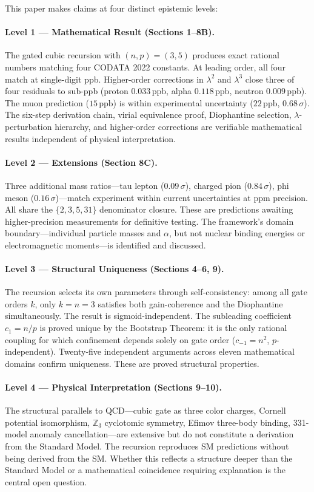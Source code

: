 \documentclass[12pt,a4paper]{article}
\theoremstyle{definition}
\newcommand{\ppb}{\,\mathrm{ppb}}
\begin{document}
This paper makes claims at four distinct epistemic levels:

\paragraph{Level 1 --- Mathematical Result (Sections 1--8B).}
The gated cubic recursion with $(n,p) = (3,5)$ produces exact rational
numbers matching four CODATA 2022 constants. At leading order, all four
match at single-digit ppb. Higher-order corrections in $\lambda^2$ and
$\lambda^3$ close three of four residuals to sub-ppb (proton $0.033\ppb$,
alpha $0.118\ppb$, neutron $0.009\ppb$). The muon prediction ($15\ppb$)
is within experimental uncertainty ($22\ppb$, $0.68\,\sigma$). The six-step
derivation chain, virial equivalence proof, Diophantine selection,
$\lambda$-perturbation hierarchy, and higher-order corrections are
verifiable mathematical results independent of physical interpretation.

\paragraph{Level 2 --- Extensions (Section 8C).}
Three additional mass ratios---tau lepton ($0.09\,\sigma$), charged pion
($0.84\,\sigma$), phi meson ($0.16\,\sigma$)---match experiment within
current uncertainties at ppm precision. All share the $\{2, 3, 5, 31\}$
denominator closure. These are predictions awaiting higher-precision
measurements for definitive testing. The framework's domain boundary---individual particle masses and $\alpha$, but not nuclear binding energies
or electromagnetic moments---is identified and discussed.

\paragraph{Level 3 --- Structural Uniqueness (Sections 4--6, 9).}
The recursion selects its own parameters through self-consistency:
among all gate orders $k$, only $k = n = 3$ satisfies both gain-coherence
and the Diophantine simultaneously. The result is sigmoid-independent.
The subleading coefficient $c_1 = n/p$ is proved unique by the Bootstrap
Theorem: it is the only rational coupling for which confinement depends
solely on gate order ($c_{-1} = n^2$, $p$-independent). Twenty-five independent
arguments across eleven mathematical domains confirm uniqueness. These are
proved structural properties.

\paragraph{Level 4 --- Physical Interpretation (Sections 9--10).}
The structural parallels to QCD---cubic gate as three color charges,
Cornell potential isomorphism, $\mathbb{Z}_3$ cyclotomic symmetry, Efimov
three-body binding, 331-model anomaly cancellation---are extensive but
do not constitute a derivation from the Standard Model. The recursion
reproduces SM predictions without being derived from the SM. Whether
this reflects a structure deeper than the Standard Model or a
mathematical coincidence requiring explanation is the central open
question.
\end{document}
